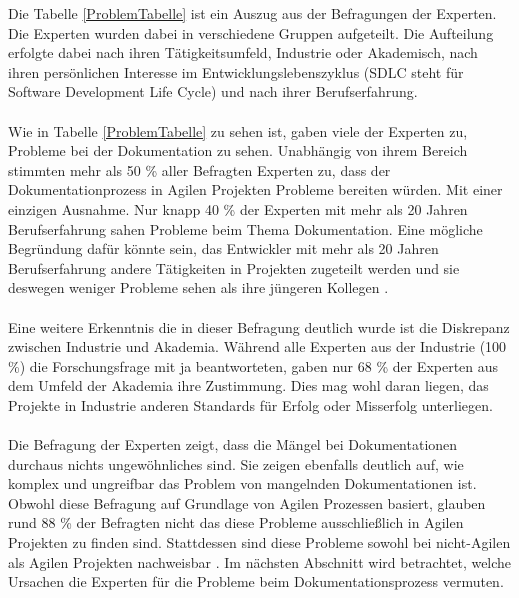 \documentclass[a4paper,12pt,twoside]{scrartcl}
\begin{document}
Die Tabelle \ref{ProblemTabelle} ist ein Auszug aus der Befragungen der Experten. Die Experten wurden dabei in verschiedene Gruppen aufgeteilt. Die Aufteilung erfolgte dabei nach ihren Tätigkeitsumfeld, Industrie oder Akademisch, nach ihren persönlichen Interesse im Entwicklungslebenszyklus (SDLC steht für Software Development Life Cycle) und nach ihrer Berufserfahrung.
\\\\
Wie in Tabelle \ref{ProblemTabelle} zu sehen ist, gaben viele der Experten zu, Probleme bei der Dokumentation zu sehen. Unabhängig von ihrem Bereich stimmten mehr als 50 \% aller Befragten Experten zu, dass der Dokumentationprozess in Agilen Projekten Probleme bereiten würden. Mit einer einzigen Ausnahme. Nur knapp 40 \% der Experten mit mehr als 20 Jahren Berufserfahrung sahen Probleme beim Thema Dokumentation. Eine mögliche Begründung dafür könnte sein, das Entwickler mit mehr als 20 Jahren Berufserfahrung andere Tätigkeiten in Projekten zugeteilt werden und sie deswegen weniger Probleme sehen als ihre jüngeren Kollegen \cite{Prause2012}.
\\\\
Eine weitere Erkenntnis die in dieser Befragung deutlich wurde ist die Diskrepanz zwischen Industrie und Akademia. Während alle Experten aus der Industrie (100 \%) die Forschungsfrage mit ja beantworteten, gaben nur 68 \% der Experten aus dem Umfeld der Akademia ihre Zustimmung. Dies mag wohl daran liegen, das Projekte in Industrie anderen Standards für Erfolg oder Misserfolg unterliegen.
\\\\
Die Befragung der Experten zeigt, dass die Mängel bei Dokumentationen durchaus nichts ungewöhnliches sind. Sie zeigen ebenfalls deutlich auf, wie komplex und ungreifbar das Problem von mangelnden Dokumentationen ist. Obwohl diese Befragung auf Grundlage von Agilen Prozessen basiert, glauben rund 88 \% der Befragten nicht das diese Probleme ausschließlich in Agilen Projekten zu finden sind. Stattdessen sind diese Probleme sowohl bei nicht-Agilen als Agilen Projekten nachweisbar \cite{Prause2012}. Im nächsten Abschnitt wird betrachtet, welche Ursachen die Experten für die Probleme beim Dokumentationsprozess vermuten.
\end{document}
